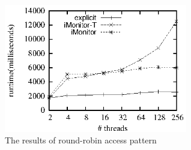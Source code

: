 \documentclass[preprint]{sigplanconf}
\begin{document}
\begin{figure}[ht!]
  \centering
  \includegraphics[width=80mm]{fig/rr.eps}
  \caption{The results of round-robin access pattern}
  \label{fig:rr_eval}
\end{figure}


%
%

\end{document}
